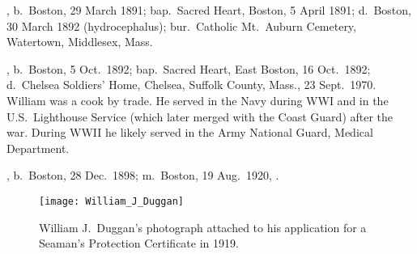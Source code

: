 \begin{Kids}
	
, b.\ Boston, 29 March 1891;\cite{EstherDugganBirth} bap.\ Sacred Heart, Boston, 5 April 1891;\cite{EstherDugganBaptism} d.\ Boston, 30 March 1892 (hydrocephalus);\cite{EstherDugganDeath} bur.\ Catholic Mt.\ Auburn Cemetery, Watertown, Middlesex, Mass.\cite{EstherDugganBurial}

, b.\ Boston, 5 Oct.\ 1892;\cite{WilliamDugganBirth} bap.\ Sacred Heart, East Boston, 16 Oct.\ 1892;\cite{WilliamDugganBaptism} d.\ Chelsea Soldiers' Home, Chelsea, Suffolk County, Mass., 23 Sept.\ 1970. William was a cook by trade.\cite{WilliamDugganDeath:1} He served in the Navy during WWI and in the U.S.\ Lighthouse Service (which later merged with the Coast Guard\cite{Lighthouse}) after the war.\cite{protection} During WWII he likely served in the Army National Guard, Medical Department.\cite{WilliamDugganWWII}


, b.\ Boston, 28 Dec.\ 1898; m.\ Boston, 19 Aug.\ 1920, .

\begin{figure}[htbp]
	\centering
	\texttt{[image: William\_J\_Duggan]}
	\caption{William J.\ Duggan's photograph attached to his application for a Seaman's Protection Certificate in 1919.}
	\label{fig:WilliamDuggan}
\end{figure}

\end{Kids}